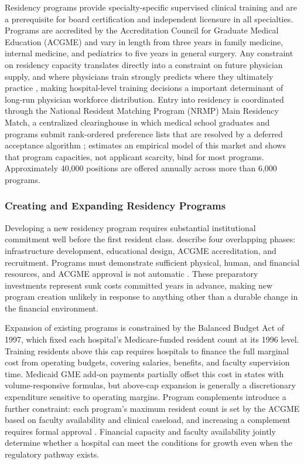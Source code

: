 Residency programs provide specialty-specific supervised clinical training and are a prerequisite for board certification and independent licensure in all specialties. Programs are accredited by the Accreditation Council for Graduate Medical Education (ACGME) and vary in length from three years in family medicine, internal medicine, and pediatrics to five years in general surgery. Any constraint on residency capacity translates directly into a constraint on future physician supply, and where physicians train strongly predicts where they ultimately practice \autocite{lefevre1983, murphy2020, orr2023}, making hospital-level training decisions a important determinant of long-run physician workforce distribution. Entry into residency is coordinated through the National Resident Matching Program (NRMP) Main Residency Match, a centralized clearinghouse in which medical school graduates and programs submit rank-ordered preference lists that are resolved by a deferred acceptance algorithm \autocite{gale1962, roth_peranson1999}; \textcite{agarwal2015} estimates an empirical model of this market and shows that program capacities, not applicant scarcity, bind for most programs. Approximately 40,000 positions are offered annually across more than 6,000 programs.

\subsubsection{Creating and Expanding Residency Programs}\label{sec:program_expansion}

Developing a new residency program requires substantial institutional commitment well before the first resident class. \textcite{barajaz2016} describe four overlapping phases: infrastructure development, educational design, ACGME accreditation, and recruitment. Programs must demonstrate sufficient physical, human, and financial resources, and ACGME approval is not automatic \autocite{acgme2022}. These preparatory investments represent sunk costs committed years in advance, making new program creation unlikely in response to anything other than a durable change in the financial environment.

Expansion of existing programs is constrained by the Balanced Budget Act of 1997, which fixed each hospital's Medicare-funded resident count at its 1996 level. Training residents above this cap requires hospitals to finance the full marginal cost from operating budgets, covering salaries, benefits, and faculty supervision time. Medicaid GME add-on payments partially offset this cost in states with volume-responsive formulas, but above-cap expansion is generally a discretionary expenditure sensitive to operating margins. Program complements introduce a further constraint: each program's maximum resident count is set by the ACGME based on faculty availability and clinical caseload, and increasing a complement requires formal approval \autocite{acgme2022}. Financial capacity and faculty availability jointly determine whether a hospital can meet the conditions for growth even when the regulatory pathway exists.

